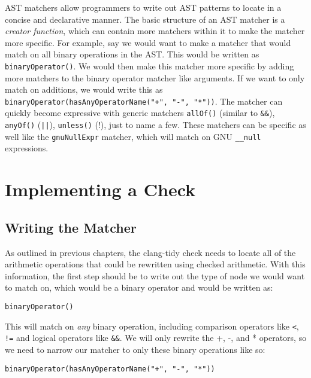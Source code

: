 AST matchers allow programmers to write out AST patterns to locate in a concise and declarative manner. The basic structure of an AST matcher is a \textit{creator function}, which can contain more matchers within it to make the matcher more specific. For example, say we would want to make a matcher that would match on all binary operations in the AST. This would be written as \texttt{binaryOperator()}. We would then make this matcher more specific by adding more matchers to the binary operator matcher like arguments. If we want to only match on additions, we would write this as \texttt{binaryOperator(hasAnyOperatorName("+", "-", "*"))}. The matcher can quickly become expressive with generic matchers \texttt{allOf()} (similar to \texttt{\&\&}), \texttt{anyOf()} (\texttt{||}), \texttt{unless()} (!), just to name a few. These matchers can be specific as well like the \texttt{gnuNullExpr} matcher, which will match on GNU \texttt{\_\_null} expressions.

\section{Implementing a Check}

\subsection{Writing the Matcher}

As outlined in previous chapters, the clang-tidy check needs to locate all of the arithmetic operations that could be rewritten using checked arithmetic. With this information, the first step should be to write out the type of node we would want to match on, which would be a binary operator and would be written as:
\begin{center}
\texttt{binaryOperator()}
\end{center}

This will match on \textit{any} binary operation, including comparison operators like \texttt{<}, \texttt{!=} and logical operators like \texttt{\&\&}. We will only rewrite the +, -, and * operators, so we need to narrow our matcher to only these binary operations like so:
\begin{center}
\texttt{binaryOperator(hasAnyOperatorName("+", "-", "*"))}
\end{center}

